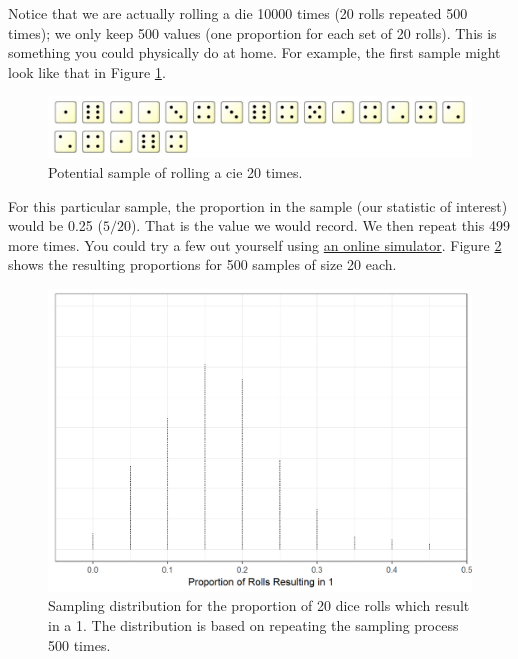 \documentclass[]{book}
\theoremstyle{definition}
\theoremstyle{definition}
\theoremstyle{remark}
\begin{document}
Notice that we are actually rolling a die 10000 times (20 rolls repeated
500 times); we only keep 500 values (one proportion for each set of 20
rolls). This is something you could physically do at home. For example,
the first sample might look like that in Figure
\ref{fig:samplingdistns-dice-example}.

\begin{figure}

{\centering \includegraphics[width=0.8\linewidth]{./images/SamplingDistns-Dice-Example} 

}

\caption{Potential sample of rolling a cie 20 times.}\label{fig:samplingdistns-dice-example}
\end{figure}

For this particular sample, the proportion in the sample (our statistic
of interest) would be 0.25 (\(5/20\)). That is the value we would
record. We then repeat this 499 more times. You could try a few out
yourself using \href{https://www.random.org/dice/?num=20}{an online
simulator}. Figure \ref{fig:samplingdistns-dice-dotplot} shows the
resulting proportions for 500 samples of size 20 each.

\begin{figure}

{\centering \includegraphics[width=0.8\linewidth]{./Images/samplingdistns-dice-dotplot-1} 

}

\caption{Sampling distribution for the proportion of 20 dice rolls which result in a 1.  The distribution is based on repeating the sampling process 500 times.}\label{fig:samplingdistns-dice-dotplot}
\end{figure}
\end{document}
